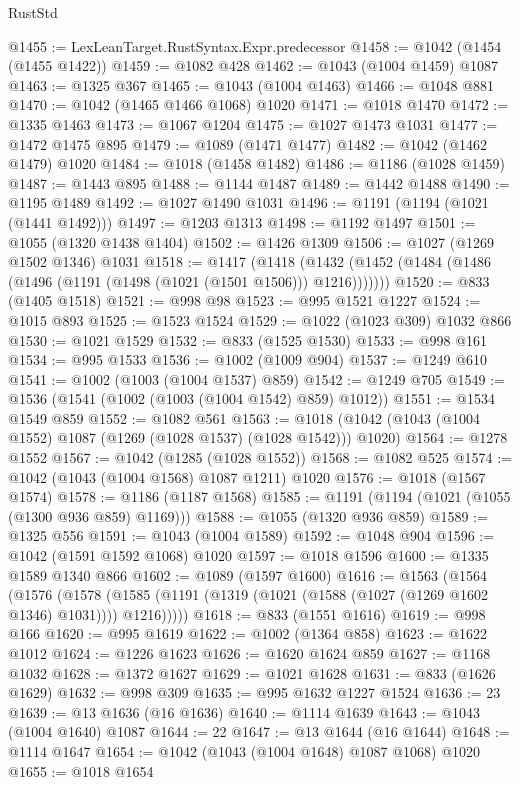 \begin{lexlean}{RustStd}
\begin{coremodule}
@1455 := LexLeanTarget.RustSyntax.Expr.predecessor
@1458 := @1042 (@1454 (@1455 @1422))
@1459 := @1082 @428
@1462 := @1043 (@1004 @1459) @1087
@1463 := @1325 @367
@1465 := @1043 (@1004 @1463)
@1466 := @1048 @881
@1470 := @1042 (@1465 @1466 @1068) @1020
@1471 := @1018 @1470
@1472 := @1335 @1463
@1473 := @1067 @1204
@1475 := @1027 @1473 @1031
@1477 := @1472 @1475 @895
@1479 := @1089 (@1471 @1477)
@1482 := @1042 (@1462 @1479) @1020
@1484 := @1018 (@1458 @1482)
@1486 := @1186 (@1028 @1459)
@1487 := @1443 @895
@1488 := @1144 @1487
@1489 := @1442 @1488
@1490 := @1195 @1489
@1492 := @1027 @1490 @1031
@1496 := @1191 (@1194 (@1021 (@1441 @1492)))
@1497 := @1203 @1313
@1498 := @1192 @1497
@1501 := @1055 (@1320 @1438 @1404)
@1502 := @1426 @1309
@1506 := @1027 (@1269 @1502 @1346) @1031
@1518 := @1417
    (@1418 (@1432 (@1452 (@1484 (@1486 (@1496 (@1191 (@1498 (@1021 (@1501 @1506))) @1216)))))))
@1520 := @833 (@1405 @1518)
@1521 := @998 @98
@1523 := @995 @1521 @1227
@1524 := @1015 @893
@1525 := @1523 @1524
@1529 := @1022 (@1023 @309) @1032 @866
@1530 := @1021 @1529
@1532 := @833 (@1525 @1530)
@1533 := @998 @161
@1534 := @995 @1533
@1536 := @1002 (@1009 @904)
@1537 := @1249 @610
@1541 := @1002 (@1003 (@1004 @1537) @859)
@1542 := @1249 @705
@1549 := @1536 (@1541 (@1002 (@1003 (@1004 @1542) @859) @1012))
@1551 := @1534 @1549 @859
@1552 := @1082 @561
@1563 := @1018 (@1042 (@1043 (@1004 @1552) @1087 (@1269 (@1028 @1537) (@1028 @1542))) @1020)
@1564 := @1278 @1552
@1567 := @1042 (@1285 (@1028 @1552))
@1568 := @1082 @525
@1574 := @1042 (@1043 (@1004 @1568) @1087 @1211) @1020
@1576 := @1018 (@1567 @1574)
@1578 := @1186 (@1187 @1568)
@1585 := @1191 (@1194 (@1021 (@1055 (@1300 @936 @859) @1169)))
@1588 := @1055 (@1320 @936 @859)
@1589 := @1325 @556
@1591 := @1043 (@1004 @1589)
@1592 := @1048 @904
@1596 := @1042 (@1591 @1592 @1068) @1020
@1597 := @1018 @1596
@1600 := @1335 @1589 @1340 @866
@1602 := @1089 (@1597 @1600)
@1616 := @1563
    (@1564
      (@1576
        (@1578 (@1585 (@1191 (@1319 (@1021 (@1588 (@1027 (@1269 @1602 @1346) @1031)))) @1216)))))
@1618 := @833 (@1551 @1616)
@1619 := @998 @166
@1620 := @995 @1619
@1622 := @1002 (@1364 @858)
@1623 := @1622 @1012
@1624 := @1226 @1623
@1626 := @1620 @1624 @859
@1627 := @1168 @1032
@1628 := @1372 @1627
@1629 := @1021 @1628
@1631 := @833 (@1626 @1629)
@1632 := @998 @309
@1635 := @995 @1632 @1227 @1524
@1636 := 23
@1639 := @13 @1636 (@16 @1636)
@1640 := @1114 @1639
@1643 := @1043 (@1004 @1640) @1087
@1644 := 22
@1647 := @13 @1644 (@16 @1644)
@1648 := @1114 @1647
@1654 := @1042 (@1043 (@1004 @1648) @1087 @1068) @1020
@1655 := @1018 @1654

\end{coremodule}
\end{lexlean}
